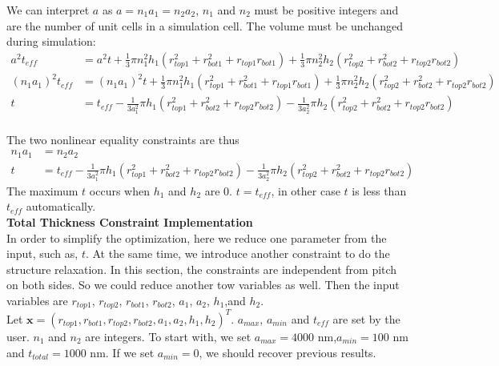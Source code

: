 \documentclass[12pt]{article}
\numberwithin{equation}{section}
\DeclarePairedDelimiter\floor{\lfloor}{\rfloor}
\numberwithin{equation}{section}
\begin{document}
\begin{outline}[enumerate]
\begin{equation}
\end{equation}
We can interpret $a$ as $a = n_1 a_1 = n_2 a_2$, $n_1$ and $n_2$ must be positive integers and are the number of unit cells in a simulation cell.  
The volume must be unchanged during simulation:
\begin{align*}
a^2 t_{eff} &= a^2 t + \frac{1}{3}\pi n_1^2 h_1(r_{top1}^2+r_{bot1}^2+r_{top1}r_{bot1})+\frac{1}{3}\pi n_2^2 h_2(r_{top2}^2+r_{bot2}^2+r_{top2}r_{bot2})\nonumber \\
(n_1a_1)^2t_{eff} &=(n_1a_1)^2t + \frac{1}{3}\pi n_1^2 h_1(r_{top1}^2+r_{bot1}^2+r_{top1}r_{bot1})+\frac{1}{3}\pi n_2^2 h_2(r_{top2}^2+r_{bot2}^2+r_{top2}r_{bot2})\nonumber \\
 t &= t_{eff} - \frac{1}{3a_1^2}\pi h_1(r_{top1}^2+r_{bot2}^2+r_{top2}r_{bot2}) - \frac{1}{3a_2^2}\pi h_2(r_{top2}^2+r_{bot2}^2+r_{top2}r_{bot2})
 \end{align*}  \\
The two nonlinear equality constraints are thus
\begin{align}
n_1 a_1 &= n_2 a_2\\
 t &= t_{eff} - \frac{1}{3a_1^2}\pi h_1(r_{top1}^2+r_{bot2}^2+r_{top2}r_{bot2}) - \frac{1}{3a_2^2}\pi h_2(r_{top2}^2+r_{bot2}^2+r_{top2}r_{bot2})
\end{align}
The maximum $t$ occurs when $h_{1}$ and $h_{2}$ are 0. $t=t_{eff}$, in other case $t$ is less than $t_{eff}$ automatically. \\


\1 \textbf{Total Thickness Constraint Implementation} \\
In order to simplify the optimization, here we reduce one parameter from the input, such as, $t$. At the same time, we introduce another constraint to do the structure relaxation.  In this section, the constraints are independent from pitch on both sides. So we could reduce another tow variables as well. Then the input variables are $r_{top1}$, $r_{top2}$, $r_{bot1}$, $r_{bot2}$, $a_1$, $a_2$, $h_1$,and $h_2$. \\
Let $\mathbf{x} = \left ( r_{top1}, r_{bot1}, r_{top2}, r_{bot2}, a_1, a_2, h_1, h_2  \right )^T $.
$a_{max}$, $a_{min}$ and $t_{eff}$ are set by the user.  $n_{1}$ and $n_{2}$ are integers. To start with, we set $a_{max} = 4000$ nm,$a_{min} = 100$ nm and $t_{total} = 1000$ nm.  If we set $a_{min} = 0$, we should recover previous results. %


\end{outline}
\end{document}
